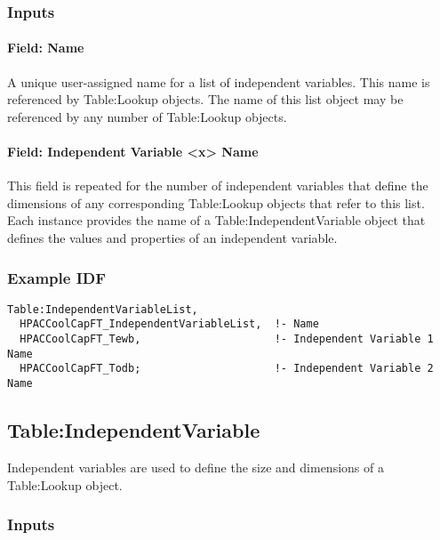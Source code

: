 \subsubsection{Inputs}\label{inputs-1}

\paragraph{Field: Name}

A unique user-assigned name for a list of independent variables. This
name is referenced by Table:Lookup objects. The name of this list object
may be referenced by any number of Table:Lookup objects.

\paragraph{Field: Independent Variable \textless{}x\textgreater{}
Name}\label{field-independent-variable-x-name}

This field is repeated for the number of independent variables that
define the dimensions of any corresponding Table:Lookup objects that
refer to this list. Each instance provides the name of a
Table:IndependentVariable object that defines the values and properties
of an independent variable.

\subsubsection{Example IDF}\label{example-idf-1}

\begin{lstlisting}
Table:IndependentVariableList,
  HPACCoolCapFT_IndependentVariableList,  !- Name
  HPACCoolCapFT_Tewb,                     !- Independent Variable 1 Name
  HPACCoolCapFT_Todb;                     !- Independent Variable 2 Name
\end{lstlisting}

\subsection{Table:IndependentVariable}\label{tableindependentvariable}

Independent variables are used to define the size and dimensions of a
Table:Lookup object.

\subsubsection{Inputs}\label{inputs-2}

